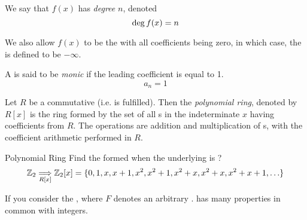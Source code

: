 \begin{definition}[Degree]\label{def:Polynomial_Degree}
  We say that $f(x)$ has \emph{degree} $n$, denoted
  \begin{equation}\label{eq:Polynomial_Degree}
    \operatorname{\operatorname{deg}} f(x) = n
  \end{equation}

  \begin{remark}
    We also allow $f(x)$ to be the  with all coefficients being zero, in which case, the  is defined to be $-\infty$.
  \end{remark}
\end{definition}

\begin{definition}[Monic]\label{def:Monic_Polynomial}
  A  is said to be \emph{monic} if the leading coefficient is equal to 1.
  \begin{equation}\label{eq:Monic_Polynomial}
    a_{n} = 1
  \end{equation}
\end{definition}

\begin{definition}\label{def:Polynomial_Ring}
  Let $R$ be a commutative  (i.e.  is fulfilled).
  Then the \emph{polynomial ring}, denoted by $R[x]$ is the ring formed by the set of all s in the indeterminate $x$ having coefficients from $R$.
  The operations are addition and multiplication of s, with the coefficient arithmetic performed in $R$.
\end{definition}

\begin{example}[Lecture 2]{Polynomial Ring}
  Find the  formed when the underlying  is ?
  \tcblower{}
  \begin{equation*}
    \operatorname{\mathbb{Z}}_{2} \underset{R[x]}{\Longrightarrow} \operatorname{\mathbb{Z}}_{2}[x] = \lbrace 0, 1, x, x+1, x^{2}, x^{2}+1, x^{2}+x, x^{2}+x, x^{2}+x+1, \ldots \rbrace
  \end{equation*}
\end{example}

If you consider the , where $F$ denotes an arbitrary .
 has many properties in common with integers.

